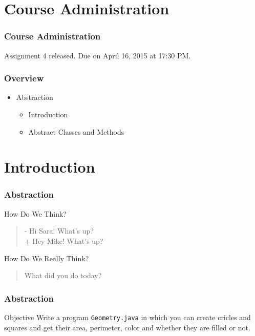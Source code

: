 \documentclass[10pt, compress]{beamer}
\begin{document}
\prepareCover

\section{Course Administration}

\begin{frame}[fragile]
\frametitle{Course Administration}
Assignment 4 released. Due on April 16, 2015 at 17:30 PM.
\end{frame}

\begin{frame}[fragile]
  \frametitle{Overview}
  \begin{itemize}
    \item[] Abstraction
    \begin{itemize}
      \item[] Introduction
      \item[] Abstract Classes and Methods
    \end{itemize}
  \end{itemize}
\end{frame}


\section{Introduction}

\begin{frame}[fragile]
  \frametitle{Abstraction}
  \begin{block}{How Do We Think?}
    \begin{quote}
      - Hi Sara! What's up?\\
      + Hey Mike! What's up?
    \end{quote}
  \end{block}
  \begin{block}{How Do We Really Think?}
    \begin{quote}
      What did you do today?
    \end{quote}
  \end{block}
\end{frame}

\begin{frame}[fragile]
  \frametitle{Abstraction}
  \begin{block}{Objective}
    Write a program \texttt{Geometry.java} in which you can create cricles and squares and get their area, perimeter, color and whether they are filled or not.
  \end{block}
\end{frame}
\end{document}
